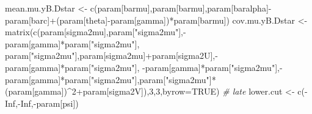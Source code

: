 \documentclass[
]{book}
\newenvironment{Shaded}{\begin{snugshade}}{\end{snugshade}}
\newcommand{\AttributeTok}[1]{\textcolor[rgb]{0.77,0.63,0.00}{#1}}
\newcommand{\CommentTok}[1]{\textcolor[rgb]{0.56,0.35,0.01}{\textit{#1}}}
\newcommand{\ConstantTok}[1]{\textcolor[rgb]{0.00,0.00,0.00}{#1}}
\newcommand{\DecValTok}[1]{\textcolor[rgb]{0.00,0.00,0.81}{#1}}
\newcommand{\FunctionTok}[1]{\textcolor[rgb]{0.00,0.00,0.00}{#1}}
\newcommand{\NormalTok}[1]{#1}
\newcommand{\OtherTok}[1]{\textcolor[rgb]{0.56,0.35,0.01}{#1}}
\newcommand{\SpecialCharTok}[1]{\textcolor[rgb]{0.00,0.00,0.00}{#1}}
\newcommand{\StringTok}[1]{\textcolor[rgb]{0.31,0.60,0.02}{#1}}
\theoremstyle{definition}
\theoremstyle{definition}
\theoremstyle{definition}
\theoremstyle{definition}
\theoremstyle{remark}
\begin{document}
\begin{Shaded}
\begin{Highlighting}[]
\NormalTok{mean.mu.yB.Dstar }\OtherTok{\textless{}{-}} \FunctionTok{c}\NormalTok{(param[}\StringTok{\textquotesingle{}barmu\textquotesingle{}}\NormalTok{],param[}\StringTok{\textquotesingle{}barmu\textquotesingle{}}\NormalTok{],param[}\StringTok{\textquotesingle{}baralpha\textquotesingle{}}\NormalTok{]}\SpecialCharTok{{-}}\NormalTok{ param[}\StringTok{\textquotesingle{}barc\textquotesingle{}}\NormalTok{]}\SpecialCharTok{+}\NormalTok{(param[}\StringTok{\textquotesingle{}theta\textquotesingle{}}\NormalTok{]}\SpecialCharTok{{-}}\NormalTok{param[}\StringTok{\textquotesingle{}gamma\textquotesingle{}}\NormalTok{])}\SpecialCharTok{*}\NormalTok{param[}\StringTok{\textquotesingle{}barmu\textquotesingle{}}\NormalTok{])}
\NormalTok{cov.mu.yB.Dstar }\OtherTok{\textless{}{-}} \FunctionTok{matrix}\NormalTok{(}\FunctionTok{c}\NormalTok{(param[}\StringTok{\textquotesingle{}sigma2mu\textquotesingle{}}\NormalTok{],param[}\StringTok{"sigma2mu"}\NormalTok{],}\SpecialCharTok{{-}}\NormalTok{param[}\StringTok{\textquotesingle{}gamma\textquotesingle{}}\NormalTok{]}\SpecialCharTok{*}\NormalTok{param[}\StringTok{"sigma2mu"}\NormalTok{],}
\NormalTok{                            param[}\StringTok{"sigma2mu"}\NormalTok{],param[}\StringTok{\textquotesingle{}sigma2mu\textquotesingle{}}\NormalTok{]}\SpecialCharTok{+}\NormalTok{param[}\StringTok{\textquotesingle{}sigma2U\textquotesingle{}}\NormalTok{],}\SpecialCharTok{{-}}\NormalTok{param[}\StringTok{\textquotesingle{}gamma\textquotesingle{}}\NormalTok{]}\SpecialCharTok{*}\NormalTok{param[}\StringTok{"sigma2mu"}\NormalTok{],}
                            \SpecialCharTok{{-}}\NormalTok{param[}\StringTok{\textquotesingle{}gamma\textquotesingle{}}\NormalTok{]}\SpecialCharTok{*}\NormalTok{param[}\StringTok{"sigma2mu"}\NormalTok{],}\SpecialCharTok{{-}}\NormalTok{param[}\StringTok{\textquotesingle{}gamma\textquotesingle{}}\NormalTok{]}\SpecialCharTok{*}\NormalTok{param[}\StringTok{"sigma2mu"}\NormalTok{],param[}\StringTok{"sigma2mu"}\NormalTok{]}\SpecialCharTok{*}\NormalTok{(param[}\StringTok{\textquotesingle{}gamma\textquotesingle{}}\NormalTok{])}\SpecialCharTok{\^{}}\DecValTok{2}\SpecialCharTok{+}\NormalTok{param[}\StringTok{\textquotesingle{}sigma2V\textquotesingle{}}\NormalTok{]),}\DecValTok{3}\NormalTok{,}\DecValTok{3}\NormalTok{,}\AttributeTok{byrow=}\ConstantTok{TRUE}\NormalTok{)}
\CommentTok{\# late}
\NormalTok{lower.cut }\OtherTok{\textless{}{-}} \FunctionTok{c}\NormalTok{(}\SpecialCharTok{{-}}\ConstantTok{Inf}\NormalTok{,}\SpecialCharTok{{-}}\ConstantTok{Inf}\NormalTok{,}\SpecialCharTok{{-}}\NormalTok{param[}\StringTok{\textquotesingle{}psi\textquotesingle{}}\NormalTok{])}

\end{Highlighting}
\end{Shaded}
\end{document}
